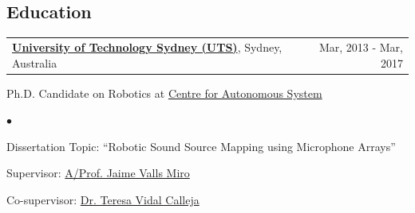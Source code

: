\documentclass[margin,line]{res}
\newenvironment{list1}{
  \begin{list}{\ding{113}}{%
      \setlength{\itemsep}{0in}
      \setlength{\parsep}{0in} \setlength{\parskip}{0in}
      \setlength{\topsep}{0in} \setlength{\partopsep}{0in} 
      \setlength{\leftmargin}{0.17in}}}{\end{list}}
\newenvironment{list2}{
  \begin{list}{$\bullet$}{%
      \setlength{\itemsep}{0in}
      \setlength{\parsep}{0in} \setlength{\parskip}{0in}
      \setlength{\topsep}{0in} \setlength{\partopsep}{0in} 
      \setlength{\leftmargin}{0.2in}}}{\end{list}}
\begin{document}
\begin{resume}
\section{\sc Education}
\begin{tabularx}{\textwidth}{X r}
\href{http://www.uts.edu.au}{{\bf University of Technology Sydney (UTS)}}, Sydney, Australia  &Mar, 2013 - Mar, 2017\\
\end{tabularx}
\vspace*{-.1in}
\begin{list1}
\item[] Ph.D. Candidate on Robotics at \href{http://www.cas.uts.edu.au}{Centre for Autonomous System}%
\begin{list2}
\vspace*{.05in}
\item Dissertation Topic:  ``Robotic Sound Source Mapping using Microphone Arrays'' 
\item Supervisor: \href{http://www.uts.edu.au/staff/jaime.vallsmiro}{A/Prof. Jaime Valls Miro}
\item Co-supervisor:  \href{http://www.uts.edu.au/staff/teresa.vidalcalleja}{Dr. Teresa Vidal Calleja}
\end{list2}
\end{list1}


\end{resume}
\end{document}
